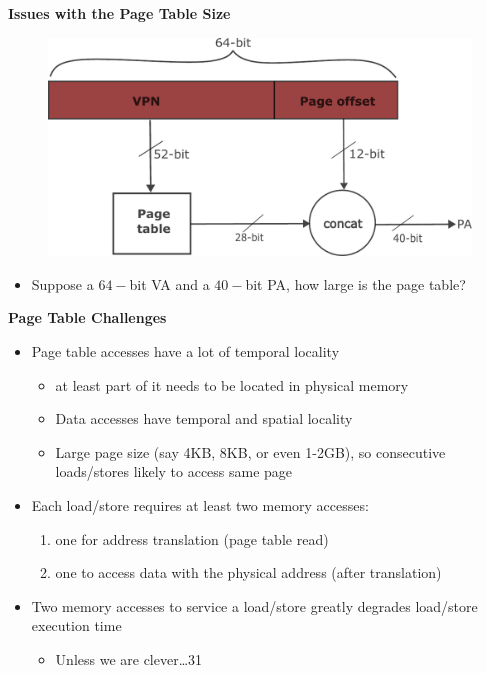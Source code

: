 \documentclass[11pt, table, aspectratio=169]{beamer}
\begin{document}
\begin{frame}{\textbf{Issues with the Page Table Size}}
	\begin{figure}
		\centering
		\includegraphics[width=0.8 \linewidth]{pic/page_issue.pdf}
	\end{figure}
	\begin{itemize}
		\item Suppose a $64-$bit VA and a $40-$bit PA, how large is the page table? 
	\end{itemize}
\end{frame}
\begin{frame}{\textbf{Page Table Challenges}}
	\begin{itemize}
		\item Page table accesses have a lot of temporal locality
		\begin{itemize}
			\item  at least part of it needs to be located in physical memory
			\item Data accesses have temporal and spatial locality
			\item Large page size (say 4KB, 8KB, or even 1-2GB), so consecutive loads/stores likely to access same page
		\end{itemize}
		\item Each load/store requires at least two memory accesses:
		
		\begin{enumerate}
			\item one for address translation (page table read)
			\item one to access data with the physical address (after translation)
		\end{enumerate}
		 \item Two memory accesses to service a load/store greatly degrades load/store execution time
		 	\begin{itemize}
		 		\item Unless we are clever…31
		 	\end{itemize}
	\end{itemize}
\end{frame}
\end{document}
